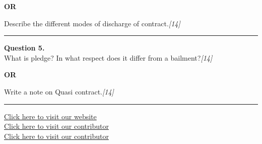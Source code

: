 \documentclass[11pt,a4paper]{article}
\newcommand{\pts}[1]{\hfill   \textit{[#1]}}
\begin{document}
\centerline{   \textbf{OR}}

Describe the different modes of discharge of contract.\pts{14}

\medskip\rule{\linewidth}{0.2pt}




\noindent   \textbf{Question 5.} \\
What is pledge? In what respect does it differ from a bailment?\pts{14}

\centerline{   \textbf{OR}}

Write a note on Quasi contract.\pts{14}

\vfill
\rule{\linewidth}{0.4pt}

\begin{center}\small
\href{https://bhu-exam.vercel.app/}{Click here to visit our website}\\[4pt]
\href{https://me-aryan.vercel.app/}{Click here to visit our contributor}\\[4pt]
\href{https://quashan-me.vercel.app/}{Click here to visit our contributor}
\end{center}
\end{document}
